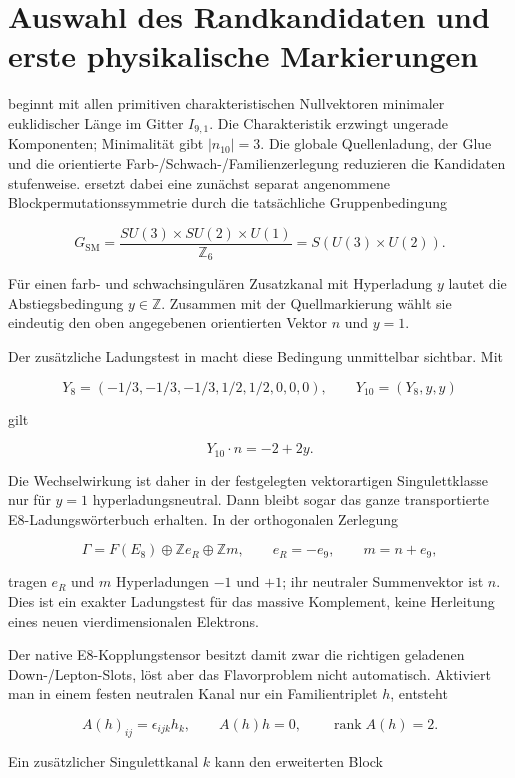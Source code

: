 \section{Auswahl des Randkandidaten und erste physikalische Markierungen}

 beginnt mit allen primitiven charakteristischen Nullvektoren minimaler euklidischer Länge im Gitter \(I_{9,1}\). Die Charakteristik erzwingt ungerade Komponenten; Minimalität gibt \(|n_{10}|=3\). Die globale Quellenladung, der Glue und die orientierte Farb-/Schwach-/Familienzerlegung reduzieren die Kandidaten stufenweise.  ersetzt dabei eine zunächst separat angenommene Blockpermutationssymmetrie durch die tatsächliche Gruppenbedingung

\[
G_\mathrm{SM}=\frac{SU(3)\times SU(2)\times U(1)}{\mathbb Z_6}=S(U(3)\times U(2)).
\]

Für einen farb- und schwachsingulären Zusatzkanal mit Hyperladung \(y\) lautet die Abstiegsbedingung \(y\in\mathbb Z\). Zusammen mit der Quellmarkierung wählt sie eindeutig den oben angegebenen orientierten Vektor \(n\) und \(y=1\).

Der zusätzliche Ladungstest in  macht diese Bedingung unmittelbar sichtbar. Mit

\[
Y_8=(-1/3,-1/3,-1/3,1/2,1/2,0,0,0),\qquad
Y_{10}=(Y_8,y,y)
\]

gilt

\[
Y_{10}\cdot n=-2+2y.
\]

Die Wechselwirkung ist daher in der festgelegten vektorartigen Singulettklasse nur für \(y=1\) hyperladungsneutral. Dann bleibt sogar das ganze transportierte E8-Ladungswörterbuch erhalten. In der orthogonalen Zerlegung

\[
\Gamma=F(E_8)\oplus \mathbb Ze_R\oplus\mathbb Zm,
\qquad e_R=-e_9,\qquad m=n+e_9,
\]

tragen \(e_R\) und \(m\) Hyperladungen \(-1\) und \(+1\); ihr neutraler Summenvektor ist \(n\). Dies ist ein exakter Ladungstest für das massive Komplement, keine Herleitung eines neuen vierdimensionalen Elektrons.

Der native E8-Kopplungstensor besitzt damit zwar die richtigen geladenen Down-/Lepton-Slots, löst aber das Flavorproblem nicht automatisch. Aktiviert man in einem festen neutralen Kanal nur ein Familientriplet \(h\), entsteht

\[
A(h)_{ij}=\epsilon_{ijk}h_k,\qquad A(h)h=0,
\qquad \operatorname{rank}A(h)=2.
\]

Ein zusätzlicher Singulettkanal \(k\) kann den erweiterten Block

